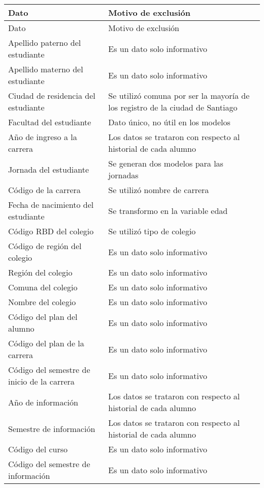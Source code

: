 \begin{longtable}{| p{5cm}| p{7cm} |}
	\hline
	Dato & Motivo de exclusión\\
	\hline \hline
	\endfirsthead
	
	\hline
	Dato & Motivo de exclusión\\
	\hline \hline
	\endhead
Apellido paterno del estudiante & Es un dato solo informativo	\\ \hline			
Apellido materno del estudiante & Es un dato solo informativo  \\ \hline
Ciudad de residencia del estudiante & Se utilizó comuna por ser la mayoría de los registro de la ciudad de Santiago\\ \hline
Facultad del estudiante & Dato único, no útil en los modelos\\ \hline
Año de ingreso a la carrera & Los datos se trataron con respecto al historial de cada alumno	\\ \hline
Jornada del estudiante & Se generan dos modelos para las jornadas	\\ \hline
Código de la carrera & Se utilizó nombre de carrera	\\ \hline
Fecha de nacimiento del estudiante & Se transformo en la variable edad	\\ \hline
Código RBD del colegio & Se utilizó tipo de colegio \\ \hline
Código de región del colegio & Es un dato solo informativo	\\ \hline
Región del colegio & Es un dato solo informativo	\\ \hline
Comuna del colegio & Es un dato solo informativo	\\ \hline
Nombre del colegio & Es un dato solo informativo	\\ \hline
Código del plan del alumno & Es un dato solo informativo	\\ \hline
Código del plan de la carrera & Es un dato solo informativo	\\ \hline
Código del semestre de inicio de la carrera & Es un dato solo informativo	\\ \hline
Año de información & Los datos se trataron con respecto al historial de cada alumno	\\ \hline
Semestre de información & Los datos se trataron con respecto al historial de cada alumno	\\ \hline
Código del curso & Es un dato solo informativo	\\ \hline
Código del semestre de información & Es un dato solo informativo	\\ \hline

\end{longtable}
